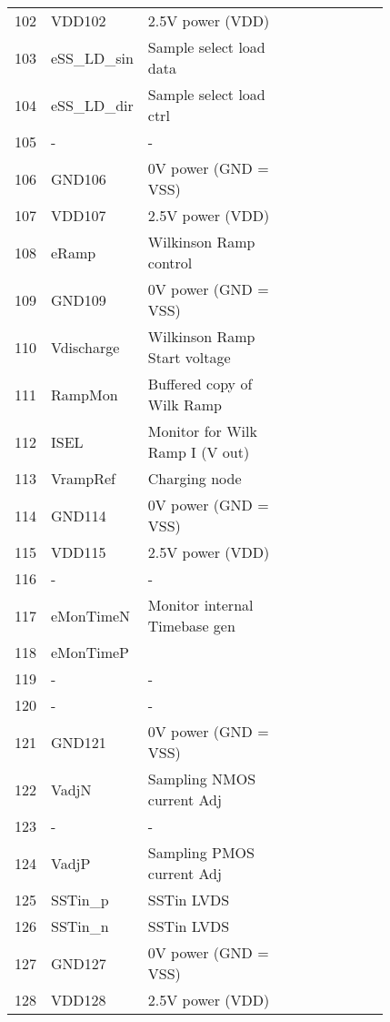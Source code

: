 \begin{footnotesize}
\begin{center}
\begin{longtabu}{  | c | p{0.12\linewidth} | p{0.4\linewidth} | p{0.3\linewidth} |}
 102	& VDD102	& 2.5V power (VDD)	& \\
 103	& eSS\_LD\_sin	& Sample select load data	& \\
 104	& eSS\_LD\_dir	& Sample select load ctrl	& \\
105	& - 	& - & \\
 106	& GND106	& 0V power (GND = VSS)	& \\
 107	& VDD107	& 2.5V power (VDD)	& \\
 108	& eRamp		& Wilkinson Ramp control	& \\
 109	& GND109	& 0V power (GND = VSS)	& \\
110	& Vdischarge	& Wilkinson Ramp Start voltage	& \\
111	& RampMon	& Buffered copy of Wilk Ramp	& \\
112	& ISEL		& Monitor for Wilk Ramp I (V out)	& \\
113	& VrampRef	& Charging node	& \\
 114	& GND114	& 0V power (GND = VSS)	& \\
 115	& VDD115	& 2.5V power (VDD)	& \\
116	& - 		& - & \\
 117	& eMonTimeN	& Monitor internal Timebase gen	& \\
 118	& eMonTimeP	& 	& \\
119	& - 		& -	& \\
120	& - 		& -		& \\
 121	& GND121	& 0V power (GND = VSS)	& \\
122	& VadjN		& Sampling NMOS current Adj	& \\
123	& -			& - 	& \\
124	& VadjP		& Sampling PMOS current Adj	& \\
 125	& SSTin\_p	& SSTin LVDS	& \\
 126	& SSTin\_n	& SSTin LVDS	& \\
 127	& GND127	& 0V power (GND = VSS)	& \\
 128	& VDD128	& 2.5V power (VDD)	& \\
\hline
\end{longtabu}
\end{center}
\end{footnotesize}
